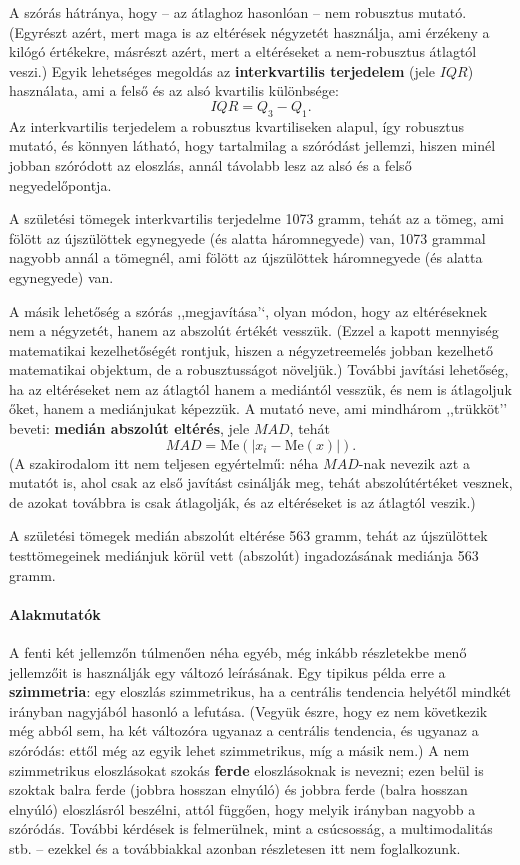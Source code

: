\documentclass[
]{book}
\begin{document}
A szórás hátránya, hogy -- az átlaghoz hasonlóan -- nem robusztus mutató. (Egyrészt azért, mert maga is az eltérések négyzetét használja, ami érzékeny a kilógó értékekre, másrészt azért, mert a eltéréseket a nem-robusztus átlagtól veszi.) Egyik lehetséges megoldás az \textbf{interkvartilis terjedelem} (jele \(IQR\)) használata, ami a felső és az alsó kvartilis különbsége:
\[
    IQR=Q_3-Q_1.
\]
Az interkvartilis terjedelem a robusztus kvartiliseken alapul, így robusztus mutató, és könnyen látható, hogy tartalmilag a szóródást jellemzi, hiszen minél jobban szóródott az eloszlás, annál távolabb lesz az alsó és a felső negyedelőpontja.

A születési tömegek interkvartilis terjedelme 1073 gramm, tehát az a tömeg, ami fölött az újszülöttek egynegyede (és alatta háromnegyede) van, 1073 grammal nagyobb annál a tömegnél, ami fölött az újszülöttek háromnegyede (és alatta egynegyede) van.

A másik lehetőség a szórás ,,megjavítása'`, olyan módon, hogy az eltéréseknek nem a négyzetét, hanem az abszolút értékét vesszük. (Ezzel a kapott mennyiség matematikai kezelhetőségét rontjuk, hiszen a négyzetreemelés jobban kezelhető matematikai objektum, de a robusztusságot növeljük.) További javítási lehetőség, ha az eltéréseket nem az átlagtól hanem a mediántól vesszük, és nem is átlagoljuk őket, hanem a mediánjukat képezzük. A mutató neve, ami mindhárom ,,trükköt'' beveti: \textbf{medián abszolút eltérés}, jele \(MAD\), tehát
\[
    MAD=\mathrm{Me}\left(\left|x_i-\mathrm{Me}\left(x\right)\right|\right).
\]
(A szakirodalom itt nem teljesen egyértelmű: néha \(MAD\)-nak nevezik azt a mutatót is, ahol csak az első javítást csinálják meg, tehát abszolútértéket vesznek, de azokat továbbra is csak átlagolják, és az eltéréseket is az átlagtól veszik.)

A születési tömegek medián abszolút eltérése 563 gramm, tehát az újszülöttek testtömegeinek mediánjuk körül vett (abszolút) ingadozásának mediánja 563 gramm.

\hypertarget{deskriptivmennyegyvaltanalitikusmutatoszamokalakmutatok}{%
\paragraph{Alakmutatók}\label{deskriptivmennyegyvaltanalitikusmutatoszamokalakmutatok}}

A fenti két jellemzőn túlmenően néha egyéb, még inkább részletekbe menő jellemzőit is használják egy változó leírásának. Egy tipikus példa erre a \textbf{szimmetria}: egy eloszlás szimmetrikus, ha a centrális tendencia helyétől mindkét irányban nagyjából hasonló a lefutása. (Vegyük észre, hogy ez nem következik még abból sem, ha két változóra ugyanaz a centrális tendencia, és ugyanaz a szóródás: ettől még az egyik lehet szimmetrikus, míg a másik nem.) A nem szimmetrikus eloszlásokat szokás \textbf{ferde} eloszlásoknak is nevezni; ezen belül is szoktak balra ferde (jobbra hosszan elnyúló) és jobbra ferde (balra hosszan elnyúló) eloszlásról beszélni, attól függően, hogy melyik irányban nagyobb a szóródás. További kérdések is felmerülnek, mint a csúcsosság, a multimodalitás stb. -- ezekkel és a továbbiakkal azonban részletesen itt nem foglalkozunk.
\end{document}

